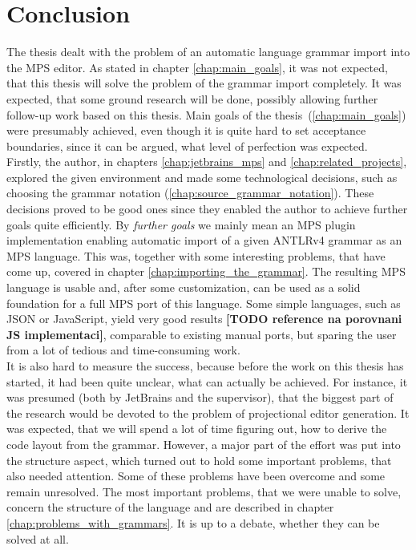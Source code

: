 \chapter{Conclusion}

The thesis dealt with the problem of an automatic language grammar import into the MPS editor.
As stated in chapter \ref{chap:main_goals}, it was not expected, that this thesis will solve the problem of the grammar import completely.
It was expected, that some ground research will be done, possibly allowing further follow-up work based on this thesis.
Main goals of the thesis~(\ref{chap:main_goals}) were presumably achieved, even though it is quite hard to set acceptance boundaries, since it can be argued, what level of perfection was expected.
\\

Firstly, the author, in chapters \ref{chap:jetbrains_mps} and \ref{chap:related_projects}, explored the given environment and made some technological decisions, such as choosing the grammar notation (\ref{chap:source_grammar_notation}).
These decisions proved to be good ones since they enabled the author to achieve further goals quite efficiently.
By \textit{further goals} we mainly mean an MPS plugin implementation enabling automatic import of a given ANTLRv4 grammar as an MPS language. This was, together with some interesting problems, that have come up, covered in chapter \ref{chap:importing_the_grammar}.
The resulting MPS language is usable and, after some customization, can be used as a solid foundation for a full MPS port of this language.
Some simple languages, such as JSON or JavaScript, yield very good results\textbf{ [TODO reference na porovnani JS implementaci]}, comparable to existing manual ports, but sparing the user from a lot of tedious and time-consuming work.
\\

It is also hard to measure the success, because before the work on this thesis has started, it had been quite unclear, what can actually be achieved.
For instance, it was presumed (both by JetBrains and the supervisor), that the biggest part of the research would be devoted to the problem of projectional editor generation.
It was expected, that we will spend a lot of time figuring out, how to derive the code layout from the grammar.
However, a major part of the effort was put into the structure aspect, which turned out to hold some important problems, that also needed attention.
Some of these problems have been overcome and some remain unresolved.
The most important problems, that we were unable to solve, concern the structure of the language and are described in chapter \ref{chap:problems_with_grammars}.
It is up to a debate, whether they can be solved at all.
\\

